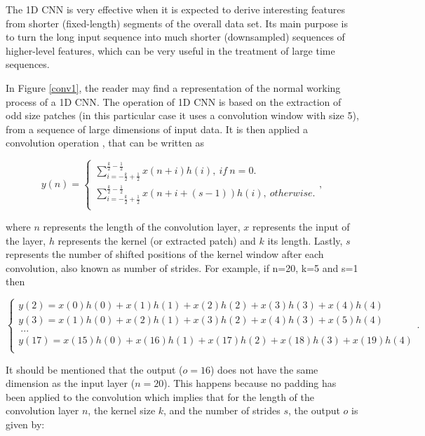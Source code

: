 The \ac{1D CNN} is very effective when it is expected to derive interesting features from shorter (fixed-length) segments of the overall data set. Its main purpose is to turn the long input sequence into much shorter (downsampled) sequences of higher-level features, which can be very useful in the treatment of large time sequences.

In Figure \ref{conv1}, the reader may find a representation of the normal working process of a \ac{1D CNN}. The operation of \ac{1D CNN} is based on the extraction of odd size patches (in this particular case it uses a convolution window with size 5), from a sequence of large dimensions of input data. It is then applied a convolution operation \cite{cnn2}, that can be written as  

\begin{equation}
y(n)=
    \begin{cases} 
            
        \sum_{i=-\frac{k}{2}+\frac{1}{2}}^{\frac{k}{2}-\frac{1}{2}} x(n+i)h(i),\  if \  n=0.\\
        \sum_{i=-\frac{k}{2}+\frac{1}{2}}^{\frac{k}{2}-\frac{1}{2}} x(n+i+(s-1))h(i),\  otherwise.\\
    
    \end{cases} ,
\end{equation}

where $n$ represents the length of the convolution layer, $x$ represents the input of the layer, $h$ represents the kernel (or extracted patch) and $k$ its length. Lastly, $s$ represents the number of shifted positions of the kernel window after each convolution, also known as number of strides. For example, if n=20, k=5 and s=1 then

\begin{equation}
    \begin{cases} 
        y(2)=x(0)h(0)+x(1)h(1)+x(2)h(2)+x(3)h(3)+x(4)h(4)\\
        y(3)=x(1)h(0)+x(2)h(1)+x(3)h(2)+x(4)h(3)+x(5)h(4)\\
        \  ...\\
        y(17)=x(15)h(0)+x(16)h(1)+x(17)h(2)+x(18)h(3)+x(19)h(4)\\
    \end{cases} .
    \label{noncausal}
\end{equation}

It should be mentioned that the output ($o=16$) does not have the same dimension as the input layer ($n=20$). This happens because no padding has been applied to the convolution which implies that for the length of the convolution layer $n$, the kernel size $k$, and the number of strides $s$, the output $o$ is given by:

